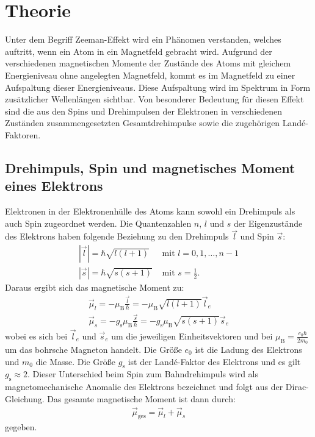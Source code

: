 
\section{Theorie}
\label{sec:Theorie}

Unter dem Begriff Zeeman-Effekt wird ein Phänomen verstanden, welches auftritt, wenn ein Atom in ein Magnetfeld gebracht wird. Aufgrund der verschiedenen magnetischen Momente der Zustände des Atoms mit gleichem Energieniveau ohne angelegten Magnetfeld, kommt es im Magnetfeld zu einer Aufspaltung dieser Energieniveaus. Diese Aufspaltung wird im Spektrum in Form zusätzlicher Wellenlängen sichtbar. Von besonderer Bedeutung für diesen Effekt sind die aus den Spins und Drehimpulsen der Elektronen in verschiedenen Zuständen zusammengesetzten Gesamtdrehimpulse sowie die zugehörigen Landé-Faktoren.


\subsection{Drehimpuls, Spin und magnetisches Moment eines Elektrons}
Elektronen in der Elektronenhülle des Atoms kann sowohl ein Drehimpuls als auch Spin zugeordnet werden. Die Quantenzahlen $n$, $l$ und $s$ der Eigenzustände des Elektrons haben folgende Beziehung zu den Drehimpuls $\vec{l}$ und Spin $\vec{s}$:
\begin{align}
	|\vec{l}|= \hbar \sqrt{l(l+1)} & \text{ mit } l=0, 1, \hdots, n-1\\
	|\vec{s}|= \hbar \sqrt{s(s+1)} & \text{ mit } s=\frac{1}{2}.
\end{align}
Daraus ergibt sich das magnetische Moment zu:
\begin{gather}
	\vec{\mu}_l=-\mu_\text{B} \frac{\vec{l}}{\hbar}=-\mu_\text{B} \sqrt{l(l+1)} \vec{l}_e \\
	\vec{\mu}_s=- g_\text{s} \mu_\text{B} \frac{\vec{s}}{\hbar}=- g_\text{s} \mu_\text{B} \sqrt{s(s+1)} \vec{s}_e
\end{gather}
wobei es sich bei $\vec{l}_e$ und $\vec{s}_e$ um die jeweiligen Einheitsvektoren und bei $\mu_\text{B}=\frac{e_0 \hbar}{2 m_0}$ um das bohrsche Magneton handelt. Die Größe $e_0$ ist die Ladung des Elektrons und $m_0$ die Masse. Die Größe $g_\text{s}$ ist der Landé-Faktor des Elektrons und es gilt $g_\text{s} \approx 2$. Dieser Unterschied beim Spin zum Bahndrehimpuls wird als magnetomechanische Anomalie des Elektrons bezeichnet und folgt aus der Dirac-Gleichung. Das gesamte magnetische Moment ist dann durch:
\begin{gather}
	\vec{\mu}_\text{ges}= \vec{\mu}_l+\vec{\mu}_s
\end{gather}
gegeben.

